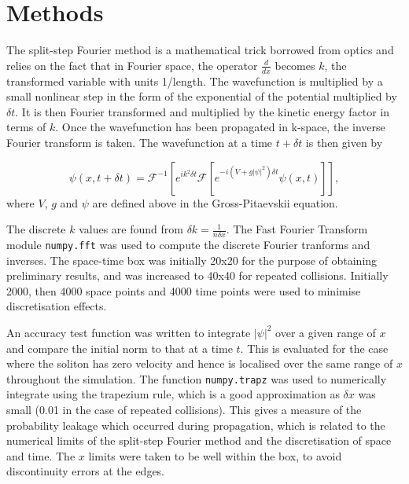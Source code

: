 \documentclass[10pt, twocolumn]{revtex4}    %
\begin{document}
\section{Methods} \label{Methods}

The split-step Fourier method is a mathematical trick borrowed from optics and relies on the fact that in Fourier space, the operator $\frac{d}{dx}$ becomes $k$, the transformed variable with units 1/length. The wavefunction is multiplied by a small nonlinear step in the form of the exponential of the potential multiplied by $\delta t$. It is then Fourier transformed and multiplied by the kinetic energy factor in terms of $k$. Once the wavefunction has been propagated in k-space, the inverse Fourier transform is taken. The wavefunction at a time $t+\delta t$ is then given by

\begin{equation} \label{fft}
\psi(x,t+\delta t) = \mathcal{F}^{-1}[e^{ik^2 \delta t} \mathcal{F} [e^{-i(V+g|\psi|^2) \delta t} \psi(x,t) ] ],
\end{equation}
where $V$, $g$ and $\psi$ are defined above in the Gross-Pitaevskii equation. 

The discrete $k$ values are found from $\delta k = \frac{1}{n \delta x}$. The Fast Fourier Transform module \texttt{numpy.fft} was used to compute the discrete Fourier tranforms and inverses. The space-time box was initially 20x20 for the purpose of obtaining preliminary results, and was increased to 40x40 for repeated collisions. Initially 2000, then 4000 space points and 4000 time points were used to minimise discretisation effects. 

An accuracy test function was written to integrate $|\psi|^2$ over a given range of $x$ and compare the initial norm to that at a time $t$. This is evaluated for the case where the soliton has zero velocity and hence is localised over the same range of $x$ throughout the simulation. The function \texttt{numpy.trapz} was used to numerically integrate using the trapezium rule, which is a good approximation as $\delta x$ was small (0.01 in the case of repeated collisions). This gives a measure of the probability leakage which occurred during propagation, which is related to the numerical limits of the split-step Fourier method and the discretisation of space and time. The $x$ limits were taken to be well within the box, to avoid discontinuity errors at the edges. 
\end{document}
